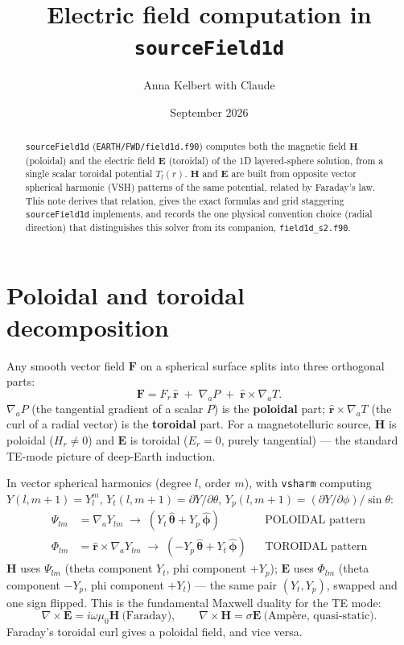 \documentclass[11pt]{article}
\title{Electric field computation in \texttt{sourceField1d}}
\author{Anna Kelbert with Claude}
\date{September 2026}
\newcommand{\rhat}{\hat{\mathbf r}}
\newcommand{\thetahat}{\hat{\boldsymbol\theta}}
\newcommand{\phihat}{\hat{\boldsymbol\phi}}
\begin{document}
\maketitle

\begin{abstract}
\texttt{sourceField1d} (\texttt{EARTH/FWD/field1d.f90}) computes both the magnetic field
$\mathbf{H}$ (poloidal) and the electric field $\mathbf{E}$ (toroidal) of the 1D layered-sphere
solution, from a single scalar toroidal potential $T_l(r)$. $\mathbf{H}$ and $\mathbf{E}$ are
built from opposite vector spherical harmonic (VSH) patterns of the same potential, related by
Faraday's law. This note derives that relation, gives the exact formulas and grid staggering
\texttt{sourceField1d} implements, and records the one physical convention choice (radial
direction) that distinguishes this solver from its companion, \texttt{field1d\_s2.f90}.
\end{abstract}

\section{Poloidal and toroidal decomposition}

Any smooth vector field $\mathbf F$ on a spherical surface splits into three orthogonal parts:
\begin{equation}
\mathbf F = F_r\,\rhat \;+\; \nabla_a P \;+\; \rhat\times\nabla_a T .
\end{equation}
$\nabla_a P$ (the tangential gradient of a scalar $P$) is the \textbf{poloidal} part;
$\rhat\times\nabla_a T$ (the curl of a radial vector) is the \textbf{toroidal} part. For a
magnetotelluric source, $\mathbf H$ is poloidal ($H_r\ne0$) and $\mathbf E$ is toroidal ($E_r=0$,
purely tangential) --- the standard TE-mode picture of deep-Earth induction.

In vector spherical harmonics (degree $l$, order $m$), with \texttt{vsharm} computing
$Y(l,m{+}1)=Y_l^m$, $Y_t(l,m{+}1)=\partial Y/\partial\theta$,
$Y_p(l,m{+}1)=(\partial Y/\partial\phi)/\sin\theta$:
\begin{align}
\Psi_{lm} &= \nabla_a Y_{lm} \;\to\; (Y_t\,\thetahat + Y_p\,\phihat) &&\text{POLOIDAL pattern} \\
\Phi_{lm} &= \rhat\times\nabla_a Y_{lm} \;\to\; (-Y_p\,\thetahat + Y_t\,\phihat) &&\text{TOROIDAL pattern}
\end{align}
$\mathbf H$ uses $\Psi_{lm}$ (theta component $Y_t$, phi component $+Y_p$); $\mathbf E$ uses
$\Phi_{lm}$ (theta component $-Y_p$, phi component $+Y_t$) --- the same pair $(Y_t,Y_p)$, swapped
and one sign flipped. This is the fundamental Maxwell duality for the TE mode:
\begin{equation}
\nabla\times\mathbf E = i\omega\mu_0\mathbf H \ \text{(Faraday)}, \qquad
\nabla\times\mathbf H = \sigma\mathbf E \ \text{(Amp\`ere, quasi-static)} .
\end{equation}
Faraday's toroidal curl gives a poloidal field, and vice versa.
\end{document}
